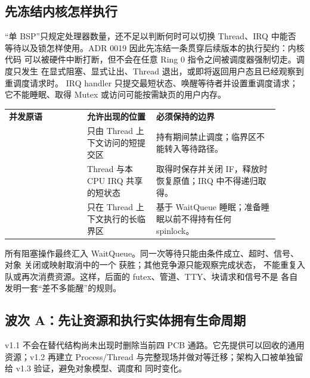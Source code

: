 \subsection*{先冻结内核怎样执行}

“单 BSP”只规定处理器数量，还不足以判断何时可以切换 Thread、IRQ 中能否
等待以及锁怎样使用。ADR 0019 因此先冻结一条贯穿后续版本的执行契约：内核代码
可以被硬件中断打断，但不会在任意 Ring 0 指令之间被调度器强制切走。调度只发生
在显式阻塞、显式让出、Thread 退出，或即将返回用户态且已经观察到重调度请求时。
IRQ handler 只提交最短状态、唤醒等待者并设置重调度请求；它不能睡眠、取得
Mutex 或访问可能按需缺页的用户内存。

\begin{longtable}{|L{0.26\linewidth}|L{0.23\linewidth}|L{0.41\linewidth}|}
\hline
{}
\textbf{并发原语} & \textbf{允许出现的位置} & \textbf{必须保持的边界} \\\tablerowrule
\endhead
{} & 只由 Thread 上下文访问的短提交区 &
持有期间禁止调度；临界区不能转入等待路径。 \\\tablerowrule
{} & Thread 与本 CPU IRQ 共享的短状态 &
取得时保存并关闭 IF，释放时恢复原值；IRQ 中不得递归取得。 \\\tablerowrule
{} & 只在 Thread 上下文执行的长临界区 &
基于 WaitQueue 睡眠；准备睡眠以前不得持有任何 spinlock。 \\\hline
\end{longtable}

所有阻塞操作最终汇入 WaitQueue。同一次等待只能由条件成立、超时、信号、对象
关闭或映射取消中的一个  获胜；其他竞争源只能观察完成状态，
不能重复入队或再次消费资源。这样，后面的 futex、管道、TTY、块请求和信号不是
各自发明一套“差不多能醒”的规则。

\subsection*{波次 A：先让资源和执行实体拥有生命周期}

v1.1 不会在替代结构尚未出现时删除当前四 PCB 通路。它先提供可以回收的通用
资源；v1.2 再建立 Process/Thread 与完整现场并做对等迁移；架构入口被单独留给
v1.3 验证，避免对象模型、调度和  同时变化。

